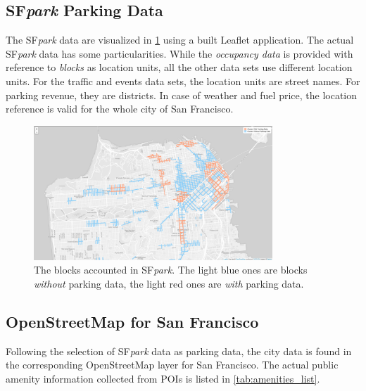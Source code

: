 \subsection{SF\textit{park} Parking Data}
\label{evaluation:sfpark}
The SF\textit{park} data are visualized in \ref{fig:before_clustering} using a built Leaflet application.
The actual SF\textit{park} data has some particularities.
While the \textit{occupancy data} is provided with reference to \textit{blocks} as location units, all the other data sets use different location units.
For the traffic and events data sets, the location units are street names.
For parking revenue, they are districts.
In case of weather and fuel price, the location reference is valid for the whole city of San Francisco. 

\begin{figure}[!ht]
	\centering
	\includegraphics[width=0.8\textwidth]{graphics/initial_view_before_clusteringV7.png}
	\caption{The blocks accounted in SF\textit{park}. The light blue ones are blocks \textit{without} parking data, the light red ones are \textit{with} parking data.}
	\label{fig:before_clustering}
\end{figure}

\subsection{OpenStreetMap for San Francisco}
\label{evaluation:osm_for_sf}
Following the selection of SF\textit{park} data as parking data, the city data is found in the corresponding OpenStreetMap layer for San Francisco.
The actual public amenity information collected from POIs is listed in \ref{tab:amenities_list}.

